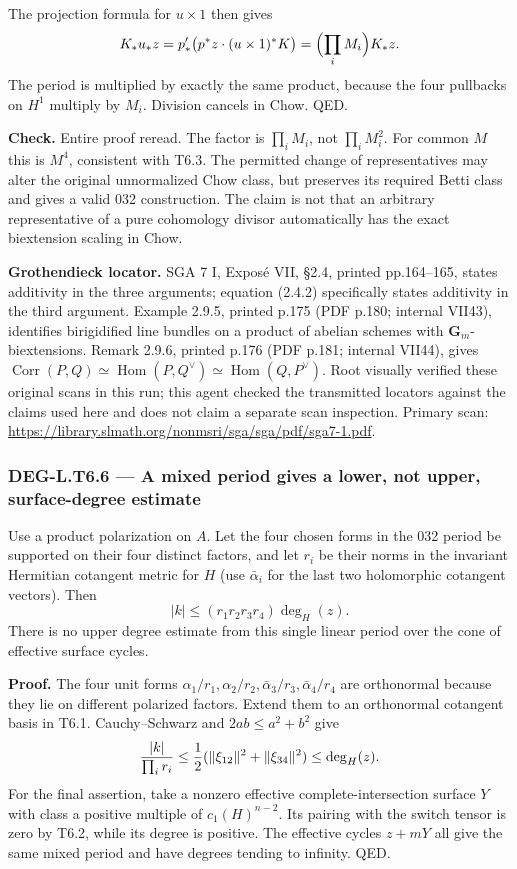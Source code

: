 \documentclass[11pt,a4paper]{article}
\theoremstyle{definition}
\begin{document}
The projection formula for \(u\times1\) then gives \[
K_*u_*z=p'_*\bigl(p^*z\cdot(u\times1)^*K\bigr)
=\Bigl(\prod_iM_i\Bigr)K_*z.
\] The period is multiplied by exactly the same product, because the four pullbacks on \(H^1\) multiply by \(M_i\). Division cancels in Chow. QED.

\textbf{Check.} Entire proof reread. The factor is \(\prod_iM_i\), not \(\prod_iM_i^2\). For common \(M\) this is \(M^4\), consistent with T6.3. The permitted change of representatives may alter the original unnormalized Chow class, but preserves its required Betti class and gives a valid 032 construction. The claim is not that an arbitrary representative of a pure cohomology divisor automatically has the exact biextension scaling in Chow.

\textbf{Grothendieck locator.} SGA 7 I, Exposé VII, §2.4, printed pp.164--165, states additivity in the three arguments; equation (2.4.2) specifically states additivity in the third argument. Example 2.9.5, printed p.175 (PDF p.180; internal VII43), identifies birigidified line bundles on a product of abelian schemes with \(\mathbf G_m\)-biextensions. Remark 2.9.6, printed p.176 (PDF p.181; internal VII44), gives \(\operatorname{Corr}(P,Q)\simeq\operatorname{Hom}(P,Q^\vee)\simeq\operatorname{Hom}(Q,P^\vee)\). Root visually verified these original scans in this run; this agent checked the transmitted locators against the claims used here and does not claim a separate scan inspection. Primary scan: \url{https://library.slmath.org/nonmsri/sga/sga/pdf/sga7-1.pdf}.

\subsubsection{DEG-L.T6.6 --- A mixed period gives a lower, not upper, surface-degree estimate}\label{DEG-L.T6.6}

Use a product polarization on \(A\). Let the four chosen forms in the 032 period be supported on their four distinct factors, and let \(r_i\) be their norms in the invariant Hermitian cotangent metric for \(H\) (use \(\bar\alpha_i\) for the last two holomorphic cotangent vectors). Then \[
|k|\le (r_1r_2r_3r_4)\deg_H(z).
\tag{G5}
\] There is no upper degree estimate from this single linear period over the cone of effective surface cycles.

\textbf{Proof.} The four unit forms \(\alpha_1/r_1,\alpha_2/r_2,\bar\alpha_3/r_3,\bar\alpha_4/r_4\) are orthonormal because they lie on different polarized factors. Extend them to an orthonormal cotangent basis in T6.1. Cauchy--Schwarz and \(2ab\le a^2+b^2\) give \[
{|k|\over\prod_i r_i}\le {1\over2}(\|\xi_{12}\|^2+\|\xi_{34}\|^2)
\le\deg_H(z).
\] For the final assertion, take a nonzero effective complete-intersection surface \(Y\) with class a positive multiple of \(c_1(H)^{n-2}\). Its pairing with the switch tensor is zero by T6.2, while its degree is positive. The effective cycles \(z+mY\) all give the same mixed period and have degrees tending to infinity. QED.
\end{document}
